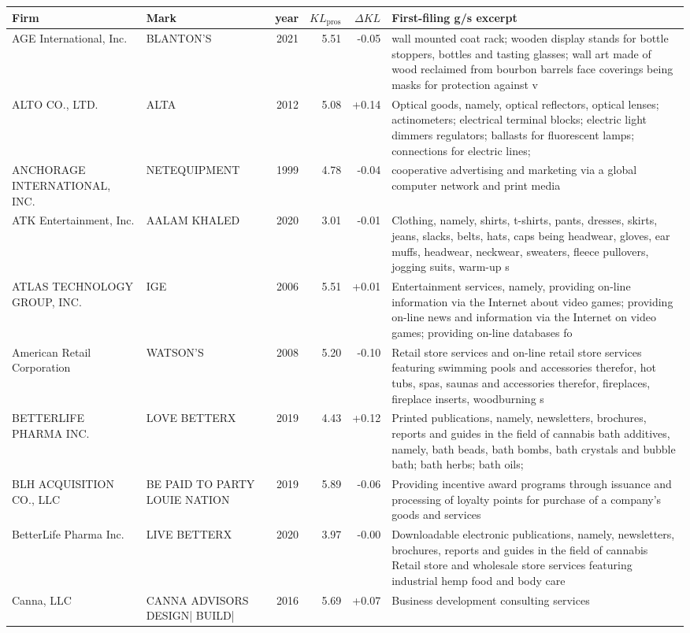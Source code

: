 \begin{tabular}{p{4.0cm}p{2.2cm}rrrp{6.5cm}}
\toprule
Firm & Mark & year & $KL_\text{pros}$ & $\Delta KL$ & First-filing g/s excerpt \\
\midrule
AGE International, Inc. & BLANTON'S & 2021 & 5.51 & -0.05 & wall mounted coat rack; wooden display stands for bottle stoppers, bottles and tasting glasses; wall art made of wood reclaimed from bourbon barrels face coverings being masks for protection against v \\
ALTO CO., LTD. & ALTA & 2012 & 5.08 & +0.14 & Optical goods, namely, optical reflectors, optical lenses; actinometers; electrical terminal blocks; electric light dimmers regulators; ballasts for fluorescent lamps; connections for electric lines;  \\
ANCHORAGE INTERNATIONAL, INC. & NETEQUIPMENT & 1999 & 4.78 & -0.04 & cooperative advertising and marketing via a global computer network and print media \\
ATK Entertainment, Inc. & AALAM KHALED & 2020 & 3.01 & -0.01 & Clothing, namely, shirts, t-shirts, pants, dresses, skirts, jeans, slacks, belts, hats, caps being headwear, gloves, ear muffs, headwear, neckwear, sweaters, fleece pullovers, jogging suits, warm-up s \\
ATLAS TECHNOLOGY GROUP, INC. & IGE & 2006 & 5.51 & +0.01 & Entertainment services, namely, providing on-line information via the Internet about video games; providing on-line news and information via the Internet on video games; providing on-line databases fo \\
American Retail Corporation & WATSON'S & 2008 & 5.20 & -0.10 & Retail store services and on-line retail store services featuring swimming pools and accessories therefor, hot tubs, spas, saunas and accessories therefor, fireplaces, fireplace inserts, woodburning s \\
BETTERLIFE PHARMA INC. & LOVE BETTERX & 2019 & 4.43 & +0.12 & Printed publications, namely, newsletters, brochures, reports and guides in the field of cannabis bath additives, namely, bath beads, bath bombs, bath crystals and bubble bath; bath herbs; bath oils;  \\
BLH ACQUISITION CO., LLC & BE PAID TO PARTY LOUIE NATION  & 2019 & 5.89 & -0.06 & Providing incentive award programs through issuance and processing of loyalty points for purchase of a company's goods and services \\
BetterLife Pharma Inc. & LIVE BETTERX & 2020 & 3.97 & -0.00 & Downloadable electronic publications, namely, newsletters, brochures, reports and guides in the field of cannabis Retail store and wholesale store services featuring industrial hemp food and body care \\
Canna, LLC & CANNA ADVISORS DESIGN| BUILD|  & 2016 & 5.69 & +0.07 & Business development consulting services \\
\bottomrule
\end{tabular}
\clearpage

